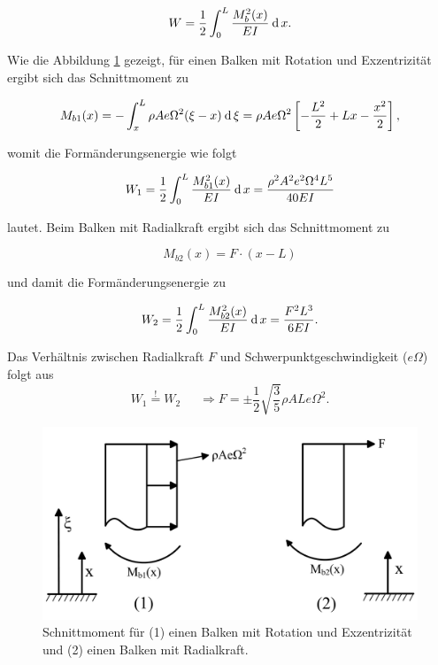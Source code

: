 	\begin{equation}\label{equ:Formanderungsenergie}
	W = \dfrac{1}{2} \int_{0}^{L} \dfrac{M_{b}^{2}(x)}{EI} \: \mathrm{d}\, x .
	\end{equation}
	
	Wie die Abbildung \ref{fig:Zusammenhang_Omega_F} gezeigt, für einen Balken mit Rotation und Exzentrizität ergibt sich das Schnittmoment zu
	
	\begin{equation}\label{equ:Biegemoment-Rotation}
	M_{b1}(x) = -\int_{x}^{L} \rho A e \Omega^{2} (\xi-x) \: \mathrm{d}\, \xi = \rho A e \Omega^{2} \left[ -\dfrac{L^{2}}{2}+Lx-\dfrac{x^{2}}{2}\right] ,
	\end{equation}
	
	womit die Formänderungsenergie wie folgt
	
	\begin{equation}\label{equ:Formanderungsenergie-Rotation}
	W_{1} = \dfrac{1}{2} \int_{0}^{L} \dfrac{M_{b1}^{2}(x)}{EI} \: \mathrm{d}\, x = \dfrac{\rho^{2}A^{2}e^{2}\Omega^{4}L^{5}}{40EI}
	\end{equation}
	
	lautet. Beim Balken mit Radialkraft ergibt sich das Schnittmoment zu
	
	\begin{equation}\label{equ:Biegemoment-Radialkraft}
	M_{b2}(x) = F\cdot(x-L)
	\end{equation}
	
	und damit die Formänderungsenergie zu
	
	\begin{equation}\label{equ:Formanderungsenergie-Radialkraft}
	W_{2} = \dfrac{1}{2} \int_{0}^{L} \dfrac{M_{b2}^{2}(x)}{EI} \: \mathrm{d}\, x = \dfrac{F^{2}L^{3}}{6EI}.
	\end{equation}
	
	Das Verhältnis zwischen Radialkraft $ F $ und Schwerpunktgeschwindigkeit ($e \Omega$) folgt aus
	\begin{equation}\label{equ:Verhältnis-Rotaion-und-Radialkraft}
	W_{1} \overset{!}{=} W_{2} \,\,\,\,\,\,\,\,\,\Rightarrow F = \pm \dfrac{1}{2} \sqrt{\dfrac{3}{5}} \rho A L e \Omega^{2}.
	\end{equation}
	
	\begin{figure}[H]
		\centering
		\includegraphics[width=0.85\linewidth, height=0.28\textheight]{Experimentelle_Untersuchungen/Zusammenhang_Omega_F}
		\caption{Schnittmoment für (1) einen Balken mit Rotation und Exzentrizität und (2) einen Balken mit Radialkraft.}
		\label{fig:Zusammenhang_Omega_F}
	\end{figure}
	
